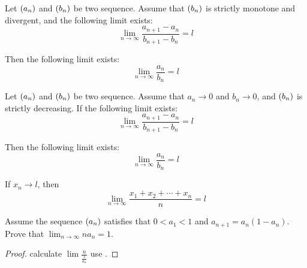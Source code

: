 \begin{theorem}\label{stolz_infity_case}
    Let $\sequence{a_n}$ and $\sequence{b_n}$ be two sequence. Assume that $\sequence{b_n}$ is strictly monotone and divergent, and the following limit exists:
    \begin{equation}
        \lim_{n \rightarrow \infty} \frac{a_{n+1} - a_n}{b_{n+1} - b_n} = l
    \end{equation}
    
    Then the following limit exists:
    \begin{equation}
        \lim_{n \rightarrow \infty} \frac{a_n}{b_n} = l
    \end{equation}
\end{theorem}



\begin{theorem}
    Let $\sequence{a_n}$ and $\sequence{b_n}$ be two sequence. Assume that $a_n \rightarrow 0$ and $b_n \rightarrow 0$, and $\sequence{b_n}$ is strictly decreasing. If the following limit exists:
    \begin{equation}
        \lim_{n \rightarrow \infty} \frac{a_{n+1} - a_n}{b_{n+1} - b_n} = l
    \end{equation}
    
    Then the following limit exists:
    \begin{equation}
        \lim_{n \rightarrow \infty} \frac{a_n}{b_n} = l
    \end{equation}
\end{theorem}

\begin{theorem}\label{cauchy_result}
    If $x_n \rightarrow l$, then
    \begin{equation}
        \lim_{n \rightarrow \infty} \frac{x_1 + x_2 + \cdots + x_n}{n} = l
    \end{equation}
\end{theorem}


\begin{theorem}
    Assume the sequence $\sequence{a_n}$ satisfies that $0 < a_1 < 1$ and $a_{n+1} = a_n (1- a_n)$. Prove that $\displaystyle \lim_{n \rightarrow \infty} n a_n = 1$.
\end{theorem}
\begin{proof}
    calculate $\lim \frac{n}{\frac{1}{a_n}}$ use .
\end{proof}

